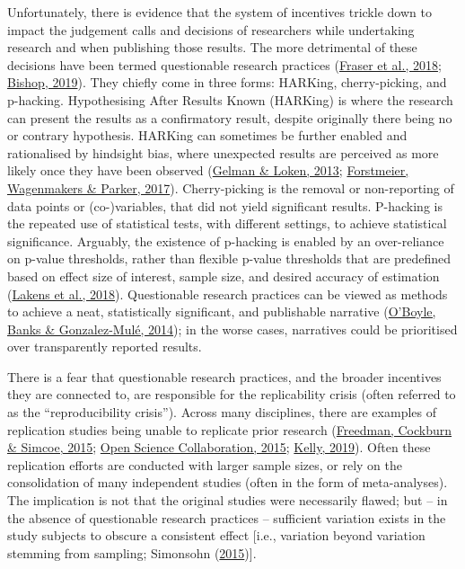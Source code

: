 \documentclass[10pt,a4paper]{article}
\begin{document}
Unfortunately, there is evidence that the system of incentives trickle down to impact the judgement calls and decisions of researchers while undertaking research and when publishing those results.
The more detrimental of these decisions have been termed questionable research practices (\protect\hyperlink{ref-fraser_questionable_2018}{Fraser et al., 2018}; \protect\hyperlink{ref-bishop_rein_2019}{Bishop, 2019}).
They chiefly come in three forms: HARKing, cherry-picking, and p-hacking.
Hypothesising After Results Known (HARKing) is where the research can present the results as a confirmatory result, despite originally there being no or contrary hypothesis.
HARKing can sometimes be further enabled and rationalised by hindsight bias, where unexpected results are perceived as more likely once they have been observed (\protect\hyperlink{ref-gelman_garden_2013}{Gelman \& Loken, 2013}; \protect\hyperlink{ref-forstmeier_detecting_2017}{Forstmeier, Wagenmakers \& Parker, 2017}).
Cherry-picking is the removal or non-reporting of data points or (co-)variables, that did not yield significant results.
P-hacking is the repeated use of statistical tests, with different settings, to achieve statistical significance.
Arguably, the existence of p-hacking is enabled by an over-reliance on p-value thresholds, rather than flexible p-value thresholds that are predefined based on effect size of interest, sample size, and desired accuracy of estimation (\protect\hyperlink{ref-lakens_justify_2018}{Lakens et al., 2018}).
Questionable research practices can be viewed as methods to achieve a neat, statistically significant, and publishable narrative (\protect\hyperlink{ref-oboyle_chrysalis_2014}{O'Boyle, Banks \& Gonzalez-Mulé, 2014}); in the worse cases, narratives could be prioritised over transparently reported results.

There is a fear that questionable research practices, and the broader incentives they are connected to, are responsible for the replicability crisis (often referred to as the ``reproducibility crisis''). Across many disciplines, there are examples of replication studies being unable to replicate prior research (\protect\hyperlink{ref-freedman_economics_2015}{Freedman, Cockburn \& Simcoe, 2015}; \protect\hyperlink{ref-open_science_collaboration_estimating_2015}{Open Science Collaboration, 2015}; \protect\hyperlink{ref-kelly_rate_2019}{Kelly, 2019}).
Often these replication efforts are conducted with larger sample sizes, or rely on the consolidation of many independent studies (often in the form of meta-analyses).
The implication is not that the original studies were necessarily flawed; but -- in the absence of questionable research practices -- sufficient variation exists in the study subjects to obscure a consistent effect {[}i.e., variation beyond variation stemming from sampling; Simonsohn (\protect\hyperlink{ref-simonsohn_small_2015}{2015}){]}.
\end{document}
